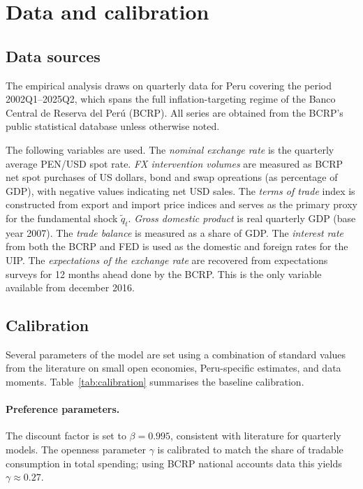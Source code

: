 \documentclass[12pt,a4paper]{article}
\begin{document}
\section{Data and calibration}
\label{sec:data_and_calibration}

\subsection{Data sources}

The empirical analysis draws on quarterly data for Peru covering the period 2002Q1--2025Q2, which spans the full inflation-targeting regime of the Banco Central de Reserva del Per\'u (BCRP). All series are obtained from the BCRP's public statistical database unless otherwise noted.

The following variables are used. The \textit{nominal exchange rate} is the quarterly average PEN/USD spot rate. \textit{FX intervention volumes} are measured as BCRP net spot purchases of US dollars, bond and swap opreations (as percentage of GDP), with negative values indicating net USD sales. The \textit{terms of trade} index is constructed from export and import price indices and serves as the primary proxy for the fundamental shock $\tilde{q}_t$. \textit{Gross domestic product} is real quarterly GDP (base year 2007). The \textit{trade balance} is measured as a share of GDP. The \textit{interest rate} from both the BCRP and FED is used as the domestic and foreign rates for the UIP. The \textit{expectations of the exchange rate} are recovered from expectations surveys for 12 months ahead done by the BCRP. This is the only variable available from december 2016.

\subsection{Calibration}

Several parameters of the model are set using a combination of standard values from the literature on small open economies, Peru-specific estimates, and data moments. Table~\ref{tab:calibration} summarises the baseline calibration.

\paragraph{Preference parameters.} The discount factor is set to $\beta = 0.995$, consistent with literature for quarterly models. The openness parameter $\gamma$ is calibrated to match the share of tradable consumption in total spending; using BCRP national accounts data this yields $\gamma \approx 0.27$.
\end{document}
